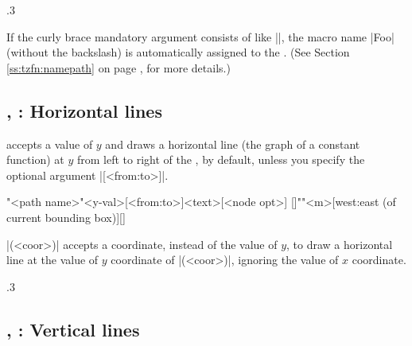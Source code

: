 \begin{tzcode}{.3}
\end{tzcode}

\remark
If the curly brace mandatory argument consists of  like |{\Foo}|, the macro name |Foo| (without the backslash) is automatically assigned to the . (See Section \ref{ss:tzfn:namepath} on page \pageref{ss:tzfn:namepath}, for more details.)

\subsection{\protect\cmd{\tzhfnat}, \protect\cmd{\tzhfn}: Horizontal lines}
\label{ssi:tzhfn}

\icmd{\tzhfnat} accepts a value of $y$ and draws a horizontal line (the graph of a constant function) at $y$ from left to right of the , by default, unless you specify the optional argument |[<from:to>]|.

\begin{tzdef}{}
\tzhfnat[<opt>]"<path name>"{<y-val>}[<from:to>]{<text>}[<node opt>]
  []""{<m>}[west:east (of current bounding box)]{}[]
\end{tzdef}

\icmd{\tzhfn}|(<coor>)| accepts a coordinate, instead of the value of $y$, to draw a horizontal line at the value of $y$ coordinate of |(<coor>)|, ignoring the value of $x$ coordinate.

\begin{tzcode}{.3}
\end{tzcode}


\subsection{\protect\cmd{\tzvfnat}, \protect\cmd{\tzvfn}: Vertical lines}
\label{ssi:tzvfn}

